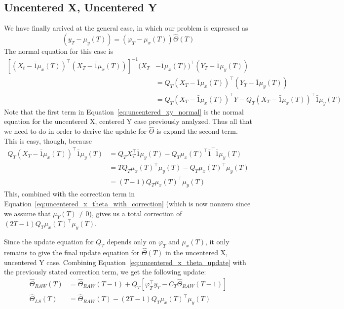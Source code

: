 \subsection{Uncentered X, Uncentered Y}
We have finally arrived at the general case, in which our problem is expressed as 
\begin{equation}
  (y_T - \mu_y(T)) = (\varphi_T - \mu_x(T))\hat\Theta(T)
\end{equation}
The normal equation for this case is 
\begin{align}
  \left[(X_t - \bar{1}\mu_x(T))^\top(X_T - \bar{1}\mu_x(T))\right]^{-1}(X_T &- \bar{1}\mu_x(T))^\top (Y_T - \bar{1}\mu_y(T)) \nonumber \\ &= Q_T(X_T - \bar{1}\mu_x(T))^\top (Y_T - \bar{1}\mu_y(T)) \\
                                                                            &= Q_T (X_T - \bar{1}\mu_x(T))^\top Y - Q_T(X_T - \bar{1}\mu_x(T))^\top\bar{1}\mu_y(T) \label{eq:uncentered_xy_normal}
\end{align}
Note that the first term in Equation~\ref{eq:uncentered_xy_normal} is the
normal equation for the uncentered X, centered Y case previously analyzed. Thus
all that we need to do in order to derive the update for $\hat\Theta$ is expand the second term. This is easy, though, because
\begin{align}
  Q_T(X_T - \bar{1}\mu_x(T))^\top\bar{1}\mu_y(T) &= Q_TX_T^\top\bar{1}\mu_y(T) - Q_T\mu_x(T)^\top\bar{1}^\top\bar{1}\mu_y(T)\\
                                                 &= TQ_T\mu_x(T)^\top \mu_y(T) - Q_T\mu_x(T)^\top\mu_y(T) \\
                                                 &= (T - 1)Q_T \mu_x(T)^\top \mu_y(T)
\end{align}
This, combined with the correction term in
Equation~\ref{eq:uncentered_x_theta_with_correction} (which is now nonzero
since we assume that $\mu_Y(T) \neq 0$), gives us a total correction of $(2T -
1) Q_T \mu_x(T)^\top \mu_y(T)$.

Since the update equation for $Q_T$ depends only on $\varphi_T$ and $\mu_x(T)$,
it only remains to give the final update equation for $\hat\Theta(T)$ in the
uncentered X, uncentered Y case. Combining Equation~\ref{eq:uncentered_x_theta_update} with the previously stated correction term, we get the following update:
\begin{align}
  \hat\Theta_{RAW}(T) &= \hat\Theta_{RAW}(T-1) + Q_T\left[\varphi_T^\top y_T - C_T\hat\Theta_{RAW}(T-1)\right]\\
  \hat\Theta_{LS}(T) &= \hat\Theta_{RAW}(T) - (2T - 1)Q_T\mu_x(T)^\top \mu_y(T)
\end{align}

